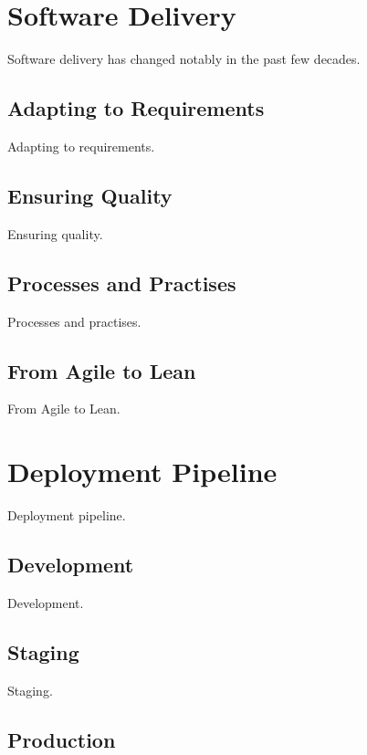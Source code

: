 \documentclass[english]{tktltiki2}
\begin{document}

\section{Software Delivery}

Software delivery has changed notably in the past few decades.

\subsection{Adapting to Requirements}

Adapting to requirements.

\subsection{Ensuring Quality}

Ensuring quality.

\subsection{Processes and Practises}

Processes and practises.

\subsection{From Agile to Lean}

From Agile to Lean.


\section{Deployment Pipeline}

Deployment pipeline.

\subsection{Development}

Development.

\subsection{Staging}

Staging.

\subsection{Production}
\end{document}
